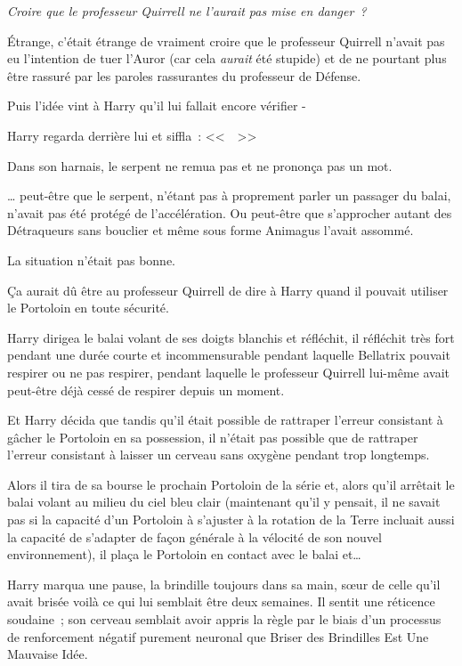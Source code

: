 \emph{Croire que le professeur Quirrell ne l'aurait pas mise en danger~?}

Étrange, c'était étrange de vraiment croire que le professeur Quirrell n'avait pas eu l'intention de tuer l'Auror (car cela \emph{aurait} été stupide) et de ne pourtant plus être rassuré par les paroles rassurantes du professeur de Défense.

Puis l'idée vint à Harry qu'il lui fallait encore vérifier -

Harry regarda derrière lui et siffla~: <<~~>>

Dans son harnais, le serpent ne remua pas et ne prononça pas un mot.

… peut-être que le serpent, n'étant pas à proprement parler un passager du balai, n'avait pas été protégé de l'accélération. Ou peut-être que s'approcher autant des Détraqueurs sans bouclier et même sous forme Animagus l'avait assommé.

La situation n'était pas bonne.

Ça aurait dû être au professeur Quirrell de dire à Harry quand il pouvait utiliser le Portoloin en toute sécurité.

Harry dirigea le balai volant de ses doigts blanchis et réfléchit, il réfléchit très fort pendant une durée courte et incommensurable pendant laquelle Bellatrix pouvait respirer ou ne pas respirer, pendant laquelle le professeur Quirrell lui-même avait peut-être déjà cessé de respirer depuis un moment.

Et Harry décida que tandis qu'il était possible de rattraper l'erreur consistant à gâcher le Portoloin en sa possession, il n'était pas possible que de rattraper l'erreur consistant à laisser un cerveau sans oxygène pendant trop longtemps.

Alors il tira de sa bourse le prochain Portoloin de la série et, alors qu'il arrêtait le balai volant au milieu du ciel bleu clair (maintenant qu'il y pensait, il ne savait pas si la capacité d'un Portoloin à s'ajuster à la rotation de la Terre incluait aussi la capacité de s'adapter de façon générale à la vélocité de son nouvel environnement), il plaça le Portoloin en contact avec le balai et…

Harry marqua une pause, la brindille toujours dans sa main, sœur de celle qu'il avait brisée voilà ce qui lui semblait être deux semaines. Il sentit une réticence soudaine~; son cerveau semblait avoir appris la règle par le biais d'un processus de renforcement négatif purement neuronal que Briser des Brindilles Est Une Mauvaise Idée.

